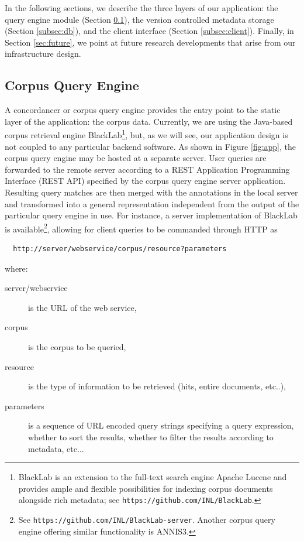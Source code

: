 \documentclass{sig-alternate}
\begin{document}
In the following sections, we describe the three layers of our application: the query engine module
(Section \ref{subsec:conc}), the version controlled metadata storage (Section \ref{subsec:db}),
and the client interface (Section \ref{subsec:client}). Finally, in Section \ref{sec:future},
we point at future research developments that arise from our infrastructure design.

\subsection{Corpus Query Engine}\label{subsec:conc}
A concordancer or corpus query engine provides the entry point to the static layer of the
application: the corpus data. Currently, we are using the Java-based corpus retrieval engine
BlackLab\footnote{
  BlackLab is an extension to the full-text search engine Apache Lucene and provides ample and
  flexible possibilities for indexing corpus documents alongside rich metadata; see
  \texttt{https://github.com/INL/BlackLab}.
}, but, as we will see, our application design is not coupled to any particular backend software.
As shown in Figure \ref{fig:app}, the corpus query engine may be hosted at a separate server.
User queries are forwarded to the remote server according to a REST Application Programming
Interface (REST API) specified by the corpus query engine server application. Resulting query
matches are then merged with the annotations in the local server and transformed into a general
representation independent from the output of the particular query engine in use.
For instance, a server implementation of BlackLab is available\footnote{
  See \texttt{https://github.com/INL/BlackLab-server}. Another corpus query engine offering similar
  functionality is ANNIS3.
}, allowing for client queries to be commanded through HTTP as
\begin{verbatim}
  http://server/webservice/corpus/resource?parameters
\end{verbatim}
where:

\begin{description}
\item [server/webservice] is the URL of the web service,
\item [corpus] is the corpus to be queried,
\item [resource] is the type of information to be retrieved (hits, entire documents, etc..),
\item [parameters] is a sequence of URL encoded query strings specifying a query expression,
  whether to sort the results, whether to filter the results according to metadata, etc...
\end{description}
\end{document}
